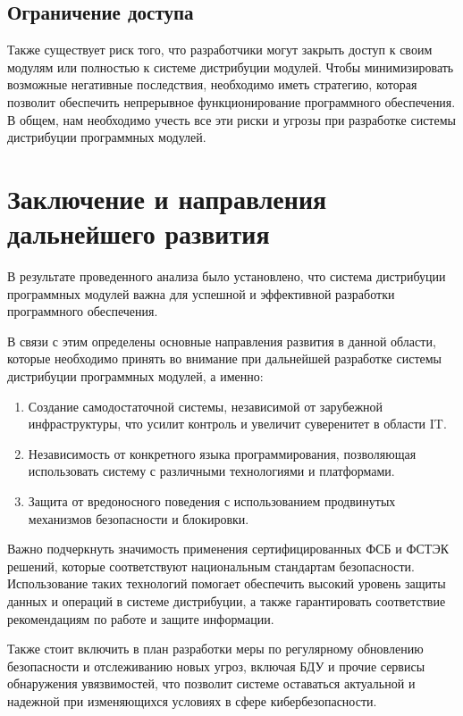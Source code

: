 \subsection{Ограничение доступа}

Также существует риск того, что разработчики могут закрыть доступ к своим модулям или полностью к системе дистрибуции модулей. Чтобы минимизировать возможные негативные последствия, необходимо иметь стратегию, которая позволит обеспечить непрерывное функционирование программного обеспечения. В общем, нам необходимо учесть все эти риски и угрозы при разработке системы дистрибуции программных модулей. 

\section{Заключение и направления дальнейшего развития}

В результате проведенного анализа было установлено, что система дистрибуции программных модулей важна для успешной и эффективной разработки программного обеспечения. 

В связи с этим определены основные направления развития в данной области, которые необходимо принять во внимание при дальнейшей разработке системы дистрибуции программных модулей, а именно:

\begin{enumerate}
\item Создание самодостаточной системы, независимой от зарубежной инфраструктуры, что усилит контроль и увеличит суверенитет в области IT.
\item Независимость от конкретного языка программирования, позволяющая использовать систему с различными технологиями и платформами.
\item Защита от вредоносного поведения с использованием продвинутых механизмов безопасности и блокировки.
\end{enumerate}

Важно подчеркнуть значимость применения сертифицированных ФСБ и ФСТЭК решений, которые соответствуют национальным стандартам безопасности. Использование таких технологий помогает обеспечить высокий уровень защиты данных и операций в системе дистрибуции, а также гарантировать соответствие рекомендациям по работе и защите информации.

Также стоит включить в план разработки меры по регулярному обновлению безопасности и отслеживанию новых угроз, включая БДУ и прочие сервисы обнаружения увязвимостей, что позволит системе оставаться актуальной и надежной при изменяющихся условиях в сфере кибербезопасности.

